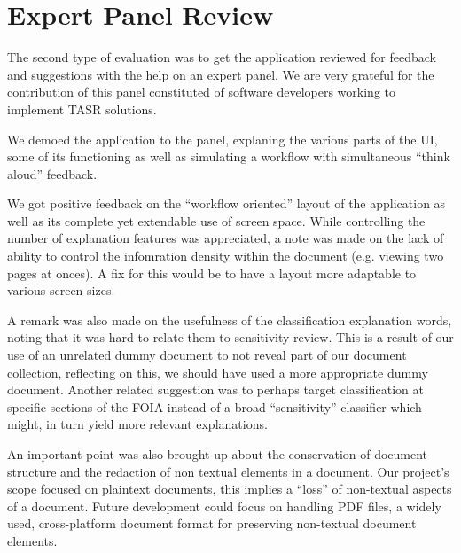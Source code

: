 \documentclass[\version]{l4proj}
\begin{document}
\section{Expert Panel Review}

The second type of evaluation was to get the application reviewed for feedback and suggestions with the help on an expert panel.
We are very grateful for the contribution of this panel constituted of software developers working to implement TASR solutions.

We demoed the application to the panel, explaning the various parts of the UI, some of its functioning as well as simulating a workflow with simultaneous ``think aloud'' feedback.

We got positive feedback on the ``workflow oriented'' layout of the application as well as its complete yet extendable use of screen space.
While controlling the number of explanation features was appreciated, a note was made on the lack of ability to control the infomration density within the document (e.g. viewing two pages at onces).
A fix for this would be to have a layout more adaptable to various screen sizes.

A remark was also made on the usefulness of the classification explanation words, noting that it was hard to relate them to sensitivity review.
This is a result of our use of an unrelated dummy document to not reveal part of our document collection, reflecting on this, we should have used a more appropriate dummy document.
Another related suggestion was to perhaps target classification at specific sections of the FOIA instead of a broad ``sensitivity'' classifier which might, in turn yield more relevant explanations.

An important point was also brought up about the conservation of document structure and the redaction of non textual elements in a document.
Our project's scope focused on plaintext documents, this implies a ``loss'' of non-textual aspects of a document.
Future development could focus on handling PDF files, a widely used, cross-platform document format for preserving non-textual document elements.


\end{document}
